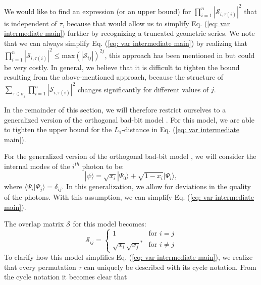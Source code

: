 \documentclass[10pt,aps,pra,twocolumn,superscriptaddress]{revtex4-2}
\begin{document}
We would like to find an expression (or an upper bound) for $\prod^n_{i=1}|\mathcal{S}_{i,\tau(i)}|^2$ that is independent of $\tau$, because that would allow us to simplify Eq. (\ref{eq: var intermediate main}) further by recognizing a truncated geometric series. We note that we can always simplify Eq. (\ref{eq: var intermediate main}) by realizing that $\prod^n_{i=1}|\mathcal{S}_{i,\tau(i)}|^2\leq \mathrm{max}(|\mathcal{S}_{ij}|)^{2j}$, this approach has been mentioned in \cite{renema2018efficient} but could be very costly. In general, we believe that it is difficult to tighten the bound resulting from the above-mentioned approach, because the structure of $\sum_{\tau\in\sigma_j}\prod^n_{i=1}|\mathcal{S}_{i,\tau(i)}|^2$ changes significantly for different values of $j$. 

In the remainder of this section, we will therefore restrict ourselves to a generalized version of the orthogonal bad-bit model \cite{sparrow2018phd_thesis,marshall2022distillation}. For this model, we are able to tighten the upper bound for the $L_1$-distance in Eq. (\ref{eq: var intermediate main}).

For the generalized version of the orthogonal bad-bit model \cite{sparrow2018phd_thesis,marshall2022distillation}, we will consider the internal modes of the $i^{th}$ photon to be:
\begin{equation}
    |\psi\rangle = \sqrt{x_i}|\Psi_0\rangle + \sqrt{1-x_i}|\Psi_i\rangle,
    \label{eq: iid obb}
\end{equation}
where $\langle\Psi_i|\Psi_j\rangle=\delta_{ij}$. In this generalization, we allow for deviations in the quality of the photons. With this assumption, we can simplify Eq. (\ref{eq: var intermediate main}).

The overlap matrix $\mathcal{S}$ for this model becomes:
\begin{equation}
  \mathcal{S}_{ij} =
    \begin{cases}
      1  & \text{for $i=j$}\\
      \sqrt{x_i}\sqrt{x_j}^* & \text{for $i\neq j$}
    \end{cases}       
\end{equation}
To clarify how this model simplifies Eq. (\ref{eq: var intermediate main}), we realize that every permutation $\tau$ can uniquely be described with its cycle notation. From the cycle notation it becomes clear that
\end{document}
